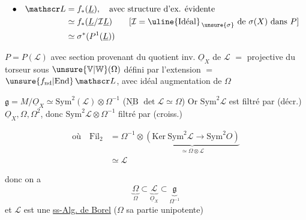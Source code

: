 \[ \begin{aligned}
 \bullet\quad\mathscr L&=f_*(\underline L),\quad\text{avec structure d'ex. évidente}\\
 &\simeq f_*(\underline L/\mathcal I\underline L)\qquad [\mathcal I=\text{\uline{Idéal}}_{\,\unsure{\sigma}}\text{ de }\sigma(X)\text{ dans }P]\\
 &\simeq\sigma^*(P^1(\underline L))
 \end{aligned} \]

$P=P(\mathscr L)$ avec section provenant du quotient inv. $\underline O_X$ de $\mathscr L$ $={}$  projective du torseur sous $\unsure{\mathbb V|\mathbb W}(\Omega)$ défini par l'extension  $={}$ $\unsure{f_{\mathrm{nd}}|\mathrm{End}}\,\mathscr L$, avec idéal augmentation de $\Omega$


$\mathfrak g=M/\underline O_X\simeq\mathrm{Sym}^2(\mathscr L)\otimes\Omega^{-1}$ ($\underline{\mathrm{NB}}$ $\det\mathscr L\simeq\Omega$) Or $\mathrm{Sym}^2\mathscr L$ est filtré par (décr.) $\underline O_X,\Omega,\Omega^2$, donc $\mathrm{Sym}^2\mathscr L\otimes\Omega^{-1}$ filtré par (croiss.)



\[ \begin{aligned}
 \text{où}\quad \mathrm{Fil}_2&=\Omega^{-1}\otimes\underbrace{(\mathrm{Ker}\ \mathrm{Sym}^2\mathscr L\longrightarrow\mathrm{Sym}^2 O)}_{\simeq\Omega\otimes\mathscr L}\\
 &\simeq\mathscr L
 \end{aligned} \]

donc on a
\[ \underset{\Omega}{\underbrace{\Omega}}\subset\underset{\underline O_X}{\underbrace{\mathscr L}}\subset\underset{\Omega^{-1}}{\underbrace{\mathfrak g}} \]
et $\mathscr L$ est une \uline{ss-Alg. de Borel} ($\Omega$ sa partie unipotente)

